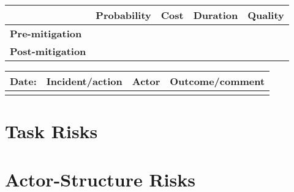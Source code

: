 \begin{table}
	\begin{tabularx}{\textwidth}{| l | l | X | X | X |}
		\hline
		 &  \textbf{Probability} & \textbf{Cost} & \textbf{Duration} & \textbf{Quality} \\ \hline
		\textbf{Pre-mitigation} & & & & \\ \hline
		\textbf{Post-mitigation} & & & & \\ \hline \hline
	\end{tabularx}
	\begin{tabularx}{\textwidth}{| l | X | l | X |}
		\hline
		\textbf{Date:} & \textbf{Incident/action} & \textbf{Actor} & \textbf{Outcome/comment} \\ \hline
		 &  &  &  \\ \hline
	\end{tabularx}%
\end{table}

\FloatBarrier

\section{Task Risks}
\label{Task_Risks}

\FloatBarrier

\FloatBarrier

\section{Actor-Structure Risks}
\label{Actor-Structure_Risks}

\FloatBarrier

